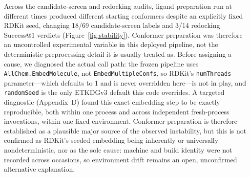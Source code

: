 \documentclass{article}
\begin{document}
Across the candidate-screen and redocking audits, ligand preparation run at different times produced different starting conformers despite an explicitly fixed RDKit seed, changing 18/69 candidate-screen labels and 3/14 redocking Success@1 verdicts (Figure~\ref{fig:stability}). Conformer preparation was therefore an uncontrolled experimental variable in this deployed pipeline, not the deterministic preprocessing detail it is usually treated as. Before assigning a cause, we diagnosed the actual call path: the frozen pipeline uses \texttt{AllChem.EmbedMolecule}, not \texttt{EmbedMultipleConfs}, so RDKit's \texttt{numThreads} parameter---which defaults to 1 and is never overridden here---is not in play, and \texttt{randomSeed} is the only ETKDGv3 default this code overrides. A targeted diagnostic (Appendix~D) found this exact embedding step to be exactly reproducible, both within one process and across independent fresh-process invocations, within one fixed environment. Conformer preparation is therefore established as a plausible major source of the observed instability, but this is not confirmed as RDKit's seeded embedding being inherently or universally nondeterministic, nor as the sole cause: machine and build identity were not recorded across occasions, so environment drift remains an open, unconfirmed alternative explanation.
\end{document}
